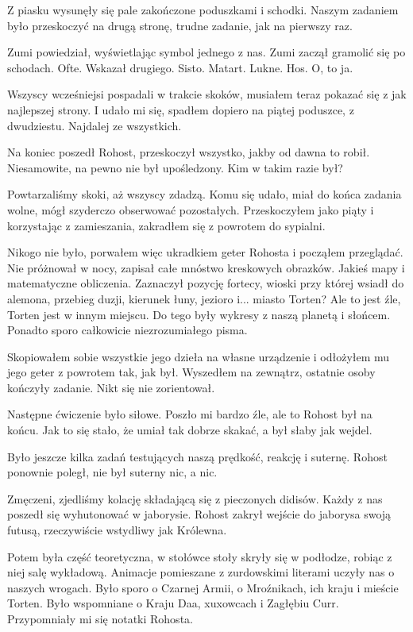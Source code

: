 Z piasku wysunęły się pale zakończone poduszkami i schodki.
Naszym zadaniem było przeskoczyć na drugą stronę, trudne zadanie, jak na pierwszy raz.
\begin{dialogue}
\ds{} Zumi \dm{} powiedział, wyświetlając symbol jednego z nas. Zumi zaczął gramolić się po schodach.
\ds{} Ofte. \dm{} Wskazał drugiego.
\ds{} Sisto.
\ds{} Matart.
\ds{} Lukne.
\ds{} Hos. \dm{} O, to ja.
\end{dialogue}
Wszyscy wcześniejsi pospadali w trakcie skoków, musiałem teraz pokazać się z jak najlepszej strony.
I udało mi się, spadłem dopiero na piątej poduszce, z dwudziestu.
Najdalej ze wszystkich.

Na koniec poszedł Rohost, przeskoczył wszystko, jakby od dawna to robił.
Niesamowite, na pewno nie był upośledzony. Kim w takim razie był?

Powtarzaliśmy skoki, aż wszyscy zdadzą.
Komu się udało, miał do końca zadania wolne, mógł szyderczo obserwować pozostałych.
Przeskoczyłem jako piąty i korzystając z zamieszania, zakradłem się z powrotem do sypialni.

Nikogo nie było, porwałem więc ukradkiem geter Rohosta i począłem przeglądać.
Nie próżnował w nocy, zapisał całe mnóstwo kreskowych obrazków.
Jakieś mapy i matematyczne obliczenia.
Zaznaczył pozycję fortecy, wioski przy której wsiadł do alemona, przebieg duzji, kierunek łuny, jezioro i... miasto Torten? Ale to jest źle, Torten jest w innym miejscu.
Do tego były wykresy z naszą planetą i słońcem.
Ponadto sporo całkowicie niezrozumiałego pisma.

Skopiowałem sobie wszystkie jego dzieła na własne urządzenie i odłożyłem mu jego geter z powrotem tak, jak był.
Wyszedłem na zewnątrz, ostatnie osoby kończyły zadanie. Nikt się nie zorientował.

Następne ćwiczenie było siłowe. 
Poszło mi bardzo źle, ale to Rohost był na końcu.
Jak to się stało, że umiał tak dobrze skakać, a był słaby jak wejdel.

Było jeszcze kilka zadań testujących naszą prędkość, reakcję i suternę.
Rohost ponownie poległ, nie był suterny nic, a nic.

Zmęczeni, zjedliśmy kolację składającą się z pieczonych didisów.
Każdy z nas poszedł się wyhutonować w jaborysie.
Rohost zakrył wejście do jaborysa swoją futusą, rzeczywiście wstydliwy jak Królewna.

Potem była część teoretyczna, w stołówce stoły skryły się w podłodze, robiąc z niej salę wykładową.
Animacje pomieszane z zurdowskimi literami uczyły nas o naszych wrogach.
Było sporo o Czarnej Armii, o Mroźnikach, ich kraju i mieście Torten. Było wspomniane o Kraju Daa, xuxowcach i Zagłębiu Curr.
Przypomniały mi się notatki Rohosta.

